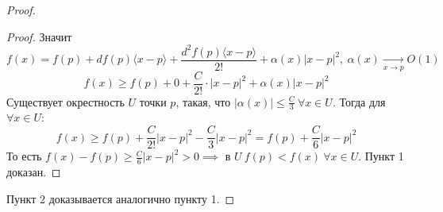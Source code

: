 \begin{theorem}
\begin{proof}
\begin{proof}
            Значит 
            \[
                f(x) = f(p) + df(p)\langle x -p \rangle + \frac{d^2f(p)\langle x - p \rangle}{2!} + \alpha(x)\left| x - p\right|^2, \ \alpha(x) \underset{x \to p }{\to} O(1)
            \]
            \[f(x) \geq f(p) + 0 + \frac{C}{2!}\cdot \left| x - p \right|^2 + \alpha(x)\left| x - p\right|^2\]
            Существует окрестность $U$ точки $p$, такая, что $\left| \alpha(x) \right| \leq \frac{C}{3} \ \forall x \in U$. Тогда для $\forall x \in U$:
            \[f(x) \geq f(p) + \frac{C}{2!}\left| x - p \right|^2 - \frac{C}{3}\left| x - p \right|^2 = f(p) + \frac{C}{6}\left| x - p\right| ^2\]
            То есть $f(x) - f(p) \geq \frac{C}{6}\left| x - p \right|^2 > 0 \implies$ в $U \ f(p) < f(x) \ \forall x \in U$. Пункт 1 доказан. 
        \end{proof}
        Пункт 2 доказывается аналогично пункту 1.
    \end{proof}
\end{theorem}

